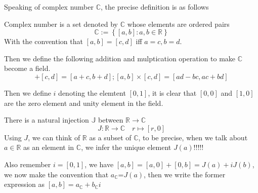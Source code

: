 \documentclass{beamer}
\begin{document}
\begin{frame}
  Speaking of complex number $\mathbb{C}$, the precise definition is as follows
  \begin{definition}
    Complex number is a set denoted by $\mathbb{C}$ whose elements are ordered pairs
\begin{equation*}
  \mathbb{C}:=\left\{[a, b]:a, b \in \mathbb{R}   \right\}
\end{equation*}
With the convention that $[a,b]=[c,d]$ iff $a=c, b=d$.
  \end{definition}
Then we define the following addition and mulptication operation to make $\mathbb{C}$ become
a field.
\begin{equation*}
  [a,b]+[c,d]=[a+c,b+d]; [a,b]\times[c,d]=[ad-bc, ac+bd]
\end{equation*}

Then we define $i$ denoting the elemtent $[0, 1]$, it is clear that 
$[0,0]$ and $[1,0]$ are the zero element and unity element in the field.


\end{frame}
\begin{frame}
  There is a natural injection $\mathbb{J}$ between $\mathbb{R} \to \mathbb{C} $
  \begin{equation*}
    J: \mathbb{R}\to \mathbb{C} \quad r\mapsto[r, 0]
  \end{equation*}
Using $J$, we can think of $\mathbb{R}$ as a subset of $\mathbb{C}$, to be precise, when 
we talk about $a\in \mathbb{R}$ as an element in $\mathbb{C}$, we infer the unique element 
$J(a)$!!!!!

Also remember $i=[0,1]$, we have $[a,b]=[a,0]+[0,b]=J(a)+iJ(b)$, we now make
 the convention that $a_\mathbb{C}$=$J(a)$, then 
we write the former expression as $[a,b]=a_\mathbb{C}+b_\mathbb{C}i$



\end{frame}
\end{document}
